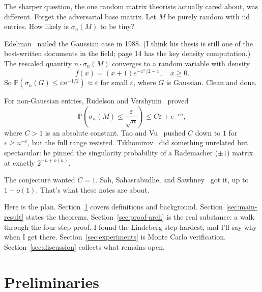 \documentclass[11pt]{article}
\theoremstyle{definition}
\theoremstyle{remark}
\newcommand{\Prob}{\mathbb{P}}
\begin{document}
The sharper question, the one random matrix theorists actually cared about, was different.
Forget the adversarial base matrix. Let $M$ be purely random with iid entries.
How likely is $\sigma_n(M)$ to be tiny?

Edelman~\cite{edelman1988eigenvalues} nailed the Gaussian case in 1988.
(I think his thesis is still one of the best-written documents in the field; page 14 has the key density computation.)
The rescaled quantity $n \cdot \sigma_n(M)$ converges to a random variable with density
\begin{equation}
  \label{eq:edelman-density}
  f(x) = (x + 1) e^{-x^2/2 - x}, \quad x \ge 0.
\end{equation}
So $\Prob(\sigma_n(G) \le \varepsilon n^{-1/2}) \approx \varepsilon$ for small
$\varepsilon$, where $G$ is Gaussian. Clean and done.

For non-Gaussian entries, Rudelson and Vershynin~\cite{rudelson2008littlewood,rudelson2009smallest}
proved
\begin{equation}
  \label{eq:rv-bound}
  \Prob\!\left(\sigma_n(M) \le \frac{\varepsilon}{\sqrt{n}}\right) \le C\varepsilon + e^{-cn},
\end{equation}
where $C > 1$ is an absolute constant.
Tao and Vu~\cite{tao2010random} pushed $C$ down to $1$ for $\varepsilon \ge n^{-c}$, but the full range resisted.
Tikhomirov~\cite{tikhomirov2020singularity} did something unrelated but spectacular: he pinned the singularity probability of a Rademacher ($\pm 1$) matrix at exactly $2^{-n + o(n)}$.

The conjecture wanted $C = 1$.
Sah, Sahasrabudhe, and Sawhney~\cite{sah2024spielman} got it, up to $1 + o(1)$.
That's what these notes are about.

Here is the plan.
Section~\ref{sec:prelim} covers definitions and background.
Section~\ref{sec:main-result} states the theorems.
Section~\ref{sec:proof-arch} is the real substance: a walk through the four-step proof. I found the Lindeberg step hardest, and I'll say why when I get there.
Section~\ref{sec:experiments} is Monte Carlo verification.
Section~\ref{sec:discussion} collects what remains open.

\section{Preliminaries}
\label{sec:prelim}
\end{document}
